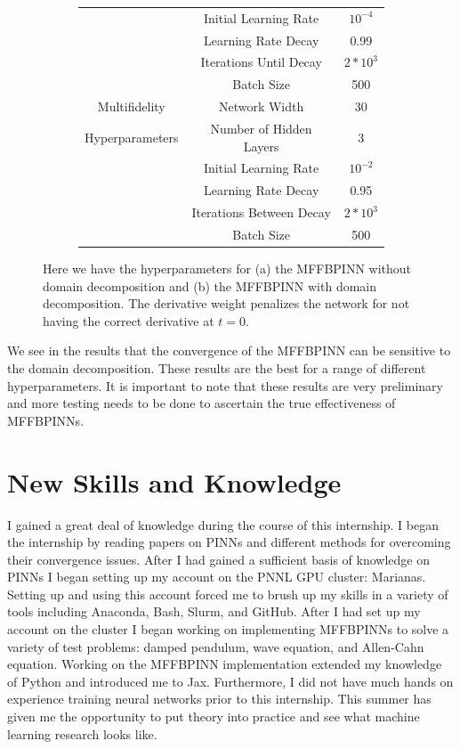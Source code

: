 \documentclass[12pt]{article}
\begin{document}
\begin{figure}[H]
\begin{subfigure}{0.49\textwidth}
\begin{center}
\begin{tabular}{|c|c|c|}
					& Initial Learning Rate &  $10^{-4}$  \\
					& Learning Rate Decay & 0.99 \\
					& Iterations Until Decay & $2*10^3$ \\
					& Batch Size & 500 \\
 	\hline
	Multifidelity	& Network Width			& 30 \\
	Hyperparameters & Number of Hidden Layers & 3 \\
					& Initial Learning Rate & $10^{-2}$ \\
					& Learning Rate Decay & 0.95 \\
					& Iterations Between Decay & $2*10^3$ \\
					& Batch Size & 500 \\
 	\hline
	\end{tabular}
	\end{center}
	\caption{}
     \label{subfig:b}
    \end{subfigure}
\caption{Here we have the hyperparameters for (a) the MFFBPINN without domain decomposition and (b) the MFFBPINN with domain decomposition. The derivative weight penalizes the network for not having the correct derivative at $t=0$.}
\end{figure}

We see in the results that the convergence of the MFFBPINN can be sensitive to the domain decomposition. These results are the best for a range of different hyperparameters. It is important to note that these results are very preliminary and more testing needs to be done to ascertain the true effectiveness of MFFBPINNs.

\section{New Skills and Knowledge}
I gained a great deal of knowledge during the course of this internship. I began the internship by reading papers on PINNs and different methods for overcoming their convergence issues. After I had gained a sufficient basis of knowledge on PINNs I began setting up my account on the PNNL GPU cluster: Marianas. Setting up and using this account forced me to brush up my skills in a variety of tools including Anaconda, Bash, Slurm, and GitHub. After I had set up my account on the cluster I began working on implementing  MFFBPINNs to solve a variety of test problems: damped pendulum, wave equation, and Allen-Cahn equation. Working on the MFFBPINN implementation extended my knowledge of Python and introduced me to Jax. Furthermore, I did not have much hands on experience training neural networks prior to this internship. This summer has given me the opportunity to put theory into practice and see what machine learning research looks like.
\end{document}
